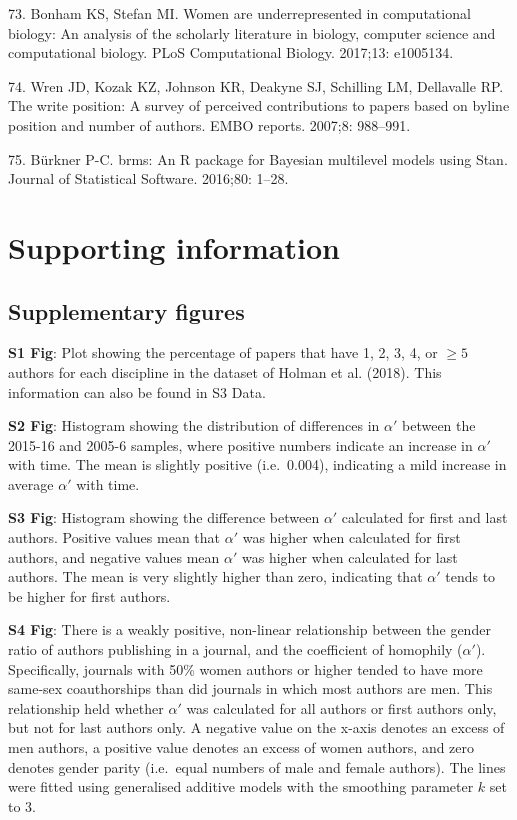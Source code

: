 \documentclass[12pt,]{article}
\begin{document}
\leavevmode\hypertarget{ref-Bonham_2017}{}%
73. Bonham KS, Stefan MI. Women are underrepresented in computational
biology: An analysis of the scholarly literature in biology, computer
science and computational biology. PLoS Computational Biology. 2017;13:
e1005134.

\leavevmode\hypertarget{ref-Wren_2007}{}%
74. Wren JD, Kozak KZ, Johnson KR, Deakyne SJ, Schilling LM, Dellavalle
RP. The write position: A survey of perceived contributions to papers
based on byline position and number of authors. EMBO reports. 2007;8:
988--991.

\leavevmode\hypertarget{ref-burkner_2016}{}%
75. Bürkner P-C. brms: An R package for Bayesian multilevel models using
Stan. Journal of Statistical Software. 2016;80: 1--28.

\newpage

\hypertarget{supporting-information}{%
\section{Supporting information}\label{supporting-information}}

\hypertarget{supplementary-figures}{%
\subsection{Supplementary figures}\label{supplementary-figures}}

\textbf{S1 Fig}: Plot showing the percentage of papers that have 1, 2,
3, 4, or \({\ge}5\) authors for each discipline in the dataset of Holman
et al. (2018). This information can also be found in S3 Data.

\textbf{S2 Fig}: Histogram showing the distribution of differences in
\(\alpha'\) between the 2015-16 and 2005-6 samples, where positive
numbers indicate an increase in \(\alpha'\) with time. The mean is
slightly positive (i.e.~0.004), indicating a mild increase in average
\(\alpha'\) with time.

\textbf{S3 Fig}: Histogram showing the difference between \(\alpha'\)
calculated for first and last authors. Positive values mean that
\(\alpha'\) was higher when calculated for first authors, and negative
values mean \(\alpha'\) was higher when calculated for last authors. The
mean is very slightly higher than zero, indicating that \(\alpha'\)
tends to be higher for first authors.

\textbf{S4 Fig}: There is a weakly positive, non-linear relationship
between the gender ratio of authors publishing in a journal, and the
coefficient of homophily (\(\alpha'\)). Specifically, journals with 50\%
women authors or higher tended to have more same-sex coauthorships than
did journals in which most authors are men. This relationship held
whether \(\alpha'\) was calculated for all authors or first authors
only, but not for last authors only. A negative value on the x-axis
denotes an excess of men authors, a positive value denotes an excess of
women authors, and zero denotes gender parity (i.e.~equal numbers of
male and female authors). The lines were fitted using generalised
additive models with the smoothing parameter \(k\) set to 3.
\end{document}
